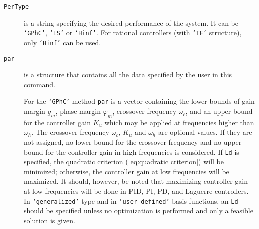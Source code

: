 \documentclass [12pt , a4paper] {report}
\begin{document}
\begin{description}
\item[\texttt{PerType}] is a string specifying the desired performance of the system. It can be \texttt{`GPhC'}, \texttt{`LS'} or \texttt{`Hinf'}. For rational controllers (with \texttt{`TF'} structure), only \texttt{`Hinf'} can be used.

             
           
             
 \item[\texttt{par}] is a structure that contains all the data specified by the user in this command.
 
 For the {\texttt{`GPhC'}} method \texttt{par} is a vector containing the lower bounds of gain margin $g_m$, phase margin $\varphi_m$, crossover frequency $\omega_c$, and an upper bound for the controller gain $K_u$ which may be applied at frequencies higher than $\omega_h$. 
The crossover frequency $\omega_c$, $K_u$ and $\omega_h$ are optional values. If they are not assigned, no lower bound for the crossover frequency and  no upper bound for the controller gain in high frequencies is considered.
If \texttt{Ld} is specified, the quadratic criterion (\ref{eq:quadratic criterion}) will be minimized; otherwise, the controller gain at low frequencies will be maximized. It should, however, be noted that maximizing controller gain at low frequencies will be done in PID, PI, PD, and Laguerre controllers. In \texttt{`generalized'} type and in \texttt{`user defined'} basis functions, an \texttt{Ld} should be specified unless no optimization is performed and only a feasible solution is given.
     

\end{description}
\end{document}

